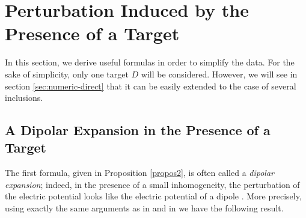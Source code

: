 \section{Perturbation Induced by the Presence of a Target}

\label{sec:perturbation-target}

In this section, we derive useful formulas in order to simplify
the data. For the sake of simplicity, only one target $D$ will be considered.
However, we will see in section \ref{sec:numeric-direct} that it can be easily
extended to the case of several inclusions.

\subsection{A Dipolar Expansion in the Presence of a Target}

\label{sub:dipolar-expansion}

The first formula, given in Proposition \ref{propos2}, is often
called a \emph{dipolar expansion}; indeed, in the presence of a
small inhomogeneity, the perturbation of the electric potential
looks like the electric potential of a dipole
\cite{ammari2004reconstruction, cedio1998identification}. More
precisely, using exactly the same arguments as in \cite[Chapter
4]{ammari2004reconstruction} and in \cite{ammarisima02} we have
the following result.

